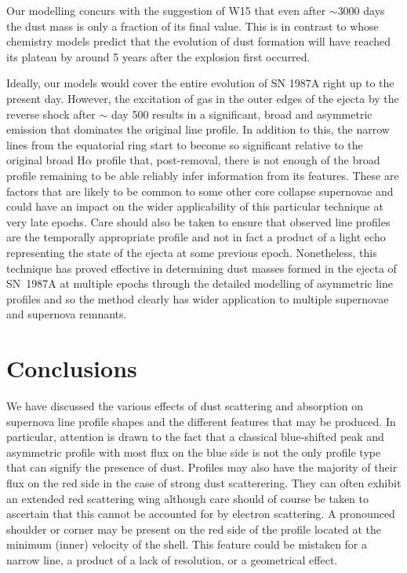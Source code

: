 \documentclass[useAMS,usenatbib,usegraphicx]{mnras}
\begin{document}
Our modelling concurs with the suggestion of W15 that even after 
$\sim$3000 days the dust mass is only a fraction of its final 
value.  This is in contrast to \citet{Sarangi2015} whose chemistry models 
predict that the evolution of dust formation will have reached its plateau 
by around 5 years after the explosion first occurred.

Ideally, our models would cover the entire evolution of SN 1987A right up 
to the present day.  However, the excitation of gas in the outer edges of 
the ejecta by the reverse shock after $\sim$ day 500 results in a 
significant, broad and asymmetric emission that dominates the original line 
profile.  In addition to this, the narrow lines from the equatorial ring start to 
become so significant relative to the original broad H$\alpha$ profile 
that, post-removal, there is not enough of the broad profile remaining to 
be able reliably infer information from its features.  These are factors 
that are likely to be common to some other core collapse supernovae and could
 have an impact on the wider applicability of this particular 
technique at very late epochs.  Care should also be taken to 
ensure that observed line profiles are the temporally appropriate profile and 
not in fact a product of a light echo representing the state of the ejecta 
at some previous epoch.  Nonetheless, this technique has proved effective 
in determining dust masses formed in the ejecta of SN~1987A at multiple epochs through the 
detailed modelling of asymmetric line profiles and so the method clearly has wider 
application to multiple supernovae and supernova remnants.


\section{Conclusions}

We have discussed the various  effects of 
dust scattering and absorption on supernova line profile shapes and 
the different features that may be produced.  In particular, attention 
is drawn to the fact that a classical blue-shifted peak and 
asymmetric profile with most flux on the blue side is not the 
only profile type that can signify the presence of dust.  Profiles may also have 
the majority of their flux on the red side in the case of strong dust
scatterering.  They can often exhibit an extended red scattering wing 
although care should of course be taken to ascertain that this cannot be 
accounted for by electron scattering. A pronounced 
shoulder or corner may be present on the red side of the profile located 
at the minimum (inner) velocity of the shell.  This feature could be mistaken 
for a narrow line, a product of a lack of resolution, or a geometrical 
effect.
\end{document}
